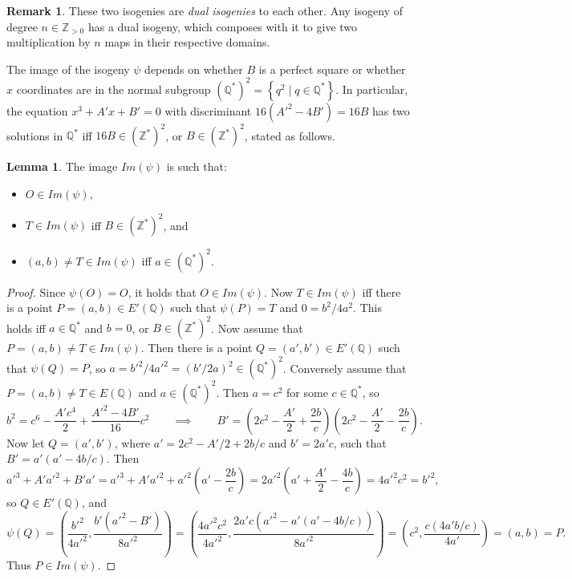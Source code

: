 \documentclass{article}
\newcommand{\Z}{\mathbb{Z}}
\newcommand{\Q}{\mathbb{Q}}
\newcommand{\rb}[1]{\left( #1 \right)}
\newcommand{\cb}[1]{\left\{ #1 \right\}}
\theoremstyle{definition}\newtheorem*{definition}{Definition}
\theoremstyle{definition}\newtheorem*{example}{Example}
\theoremstyle{definition}\newtheorem*{remark}{Remark}
\newtheorem{lemma}[proposition]{Lemma}
\begin{document}
\begin{remark}
These two isogenies are \emph{dual isogenies} to each other. Any isogeny of degree $ n \in \Z_{> 0} $ has a dual isogeny, which composes with it to give two multiplication by $ n $ maps in their respective domains.
\end{remark}

\pagebreak

The image of the isogeny $ \psi $ depends on whether $ B $ is a perfect square or whether $ x $ coordinates are in the normal subgroup $ \rb{\Q^*}^2 = \cb{q^2 \mid q \in \Q^*} $. In particular, the equation $ x^3 + A'x + B' = 0 $ with discriminant $ 16\rb{A'^2 - 4B'} = 16B $ has two solutions in $ \Q^* $ iff $ 16B \in \rb{\Z^*}^2 $, or $ B \in \rb{\Z^*}^2 $, stated as follows.

\begin{lemma}
The image $ Im\rb{\psi} $ is such that:
\begin{itemize}
\item $ O \in Im\rb{\psi} $,
\item $ T \in Im\rb{\psi} $ iff $ B \in \rb{\Z^*}^2 $, and
\item $ \rb{a, b} \ne T \in Im\rb{\psi} $ iff $ a \in \rb{\Q^*}^2 $.
\end{itemize}
\end{lemma}

\begin{proof}
Since $ \psi\rb{O} = O $, it holds that $ O \in Im\rb{\psi} $. Now $ T \in Im\rb{\psi} $ iff there is a point $ P = \rb{a, b} \in E'\rb{\Q} $ such that $ \psi\rb{P} = T $ and $ 0 = b^2 / 4a^2 $. This holds iff $ a \in \Q^* $ and $ b = 0 $, or $ B \in \rb{\Z^*}^2 $. Now assume that $ P = \rb{a, b} \ne T \in Im\rb{\psi} $. Then there is a point $ Q = \rb{a', b'} \in E'\rb{\Q} $ such that $ \psi\rb{Q} = P $, so $ a = b'^2 / 4a'^2 = \rb{b' / 2a}^2 \in \rb{\Q^*}^2 $. Conversely assume that $ P = \rb{a, b} \ne T \in E\rb{\Q} $ and $ a \in \rb{\Q^*}^2 $. Then $ a = c^2 $ for some $ c \in \Q^* $, so
$$ b^2 = c^6 - \dfrac{A'c^4}{2} + \dfrac{A'^2 - 4B'}{16}c^2 \qquad \implies \qquad B' = \rb{2c^2 - \dfrac{A'}{2} + \dfrac{2b}{c}}\rb{2c^2 - \dfrac{A'}{2} - \dfrac{2b}{c}}. $$
Now let $ Q = \rb{a', b'} $, where $ a' = 2c^2 - A' / 2 + 2b / c $ and $ b' = 2a'c $, such that $ B' = a'\rb{a' - 4b / c} $. Then
$$ a'^3 + A'a'^2 + B'a' = a'^3 + A'a'^2 + a'^2\rb{a' - \dfrac{2b}{c}} = 2a'^2\rb{a' + \dfrac{A'}{2} - \dfrac{4b}{c}} = 4a'^2c^2 = b'^2, $$
so $ Q \in E'\rb{\Q} $, and
$$ \psi\rb{Q} = \rb{\dfrac{b'^2}{4a'^2}, \dfrac{b'\rb{a'^2 - B'}}{8a'^2}} = \rb{\dfrac{4a'^2c^2}{4a'^2}, \dfrac{2a'c\rb{a'^2 - a'\rb{a' - 4b / c}}}{8a'^2}} = \rb{c^2, \dfrac{c\rb{4a'b / c}}{4a'}} = \rb{a, b} = P. $$
Thus $ P \in Im\rb{\psi} $.
\end{proof}
\end{document}
